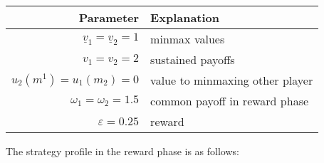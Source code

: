 \documentclass[11pt]{article}
\begin{document}
\begin{enumerate}
\begin{enumerate}
		\begin{table*}[!ht]
			\centering
			\begin{tabular}{r|l} 
				Parameter & Explanation \\ \hline 
				$ \underline{v}_1 = \underline{v}_2 = 1 $ & minmax values\\
				$ v_1 = v_2 = 2 $ & sustained payoffs\\
				$ u_2(m^1) = u_1(m_2) = 0 $ & value to minmaxing other player \\
				$ \omega_1 = \omega_2 = 1.5 $ & common payoff in reward phase\\
				$ \varepsilon = 0.25 $ & reward \\
			\end{tabular}
		\end{table*}
		The strategy profile in the reward phase is as follows: 
		
	\end{enumerate}
\end{enumerate}
\end{document}
